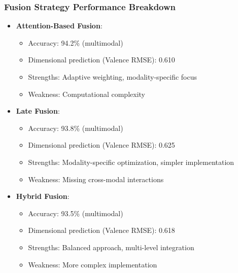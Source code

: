 \begin{frame}
\frametitle{Fusion Strategy Performance Breakdown}
\begin{itemize}
    \item \textbf{Attention-Based Fusion}:
    \begin{itemize}
        \item Accuracy: 94.2\% (multimodal)
        \item Dimensional prediction (Valence RMSE): 0.610
        \item Strengths: Adaptive weighting, modality-specific focus
        \item Weakness: Computational complexity
    \end{itemize}
    \item \textbf{Late Fusion}:
    \begin{itemize}
        \item Accuracy: 93.8\% (multimodal)
        \item Dimensional prediction (Valence RMSE): 0.625
        \item Strengths: Modality-specific optimization, simpler implementation
        \item Weakness: Missing cross-modal interactions
    \end{itemize}
    \item \textbf{Hybrid Fusion}:
    \begin{itemize}
        \item Accuracy: 93.5\% (multimodal)
        \item Dimensional prediction (Valence RMSE): 0.618
        \item Strengths: Balanced approach, multi-level integration
        \item Weakness: More complex implementation
    \end{itemize}
\end{itemize}
\end{frame}

